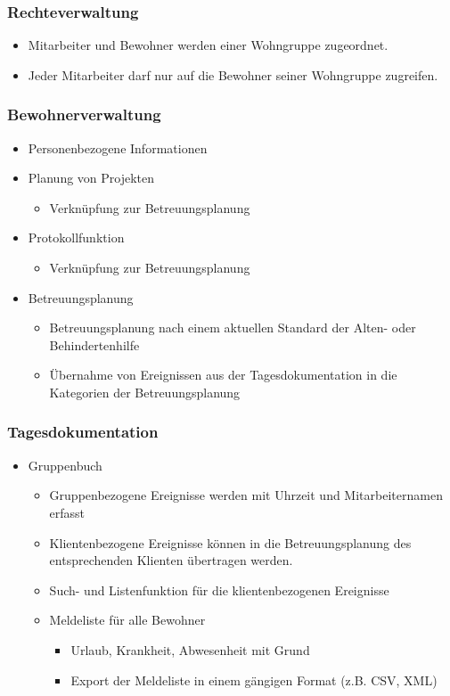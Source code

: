 \documentclass[a4paper,10pt]{article}
\begin{document}
\subsubsection{Rechteverwaltung}
\begin{itemize}
	\item Mitarbeiter und Bewohner werden einer Wohngruppe zugeordnet.
	\item Jeder Mitarbeiter darf nur auf die Bewohner seiner Wohngruppe zugreifen.
\end{itemize}
\subsubsection{Bewohnerverwaltung}
\begin{itemize}
	\item Personenbezogene Informationen
	\item Planung von Projekten
	\begin{itemize}
		\item Verknüpfung zur Betreuungsplanung
	\end{itemize}
	\item Protokollfunktion
	\begin{itemize}
		\item Verknüpfung zur Betreuungsplanung
	\end{itemize}
	\item  Betreuungsplanung
	\begin{itemize}
		\item Betreuungsplanung nach einem aktuellen Standard der Alten- oder Behindertenhilfe
		\item Übernahme von Ereignissen aus der Tagesdokumentation in die Kategorien der Betreuungsplanung
	\end{itemize}
\end{itemize}
\subsubsection{Tagesdokumentation}
\begin{itemize}
	\item Gruppenbuch
	\begin{itemize}
		\item Gruppenbezogene Ereignisse werden mit Uhrzeit und Mitarbeiternamen erfasst
		\item Klientenbezogene Ereignisse können in die Betreuungsplanung des entsprechenden Klienten übertragen werden.
		\item Such- und Listenfunktion für die klientenbezogenen Ereignisse
		\item Meldeliste für alle Bewohner
		\begin{itemize}
			\item Urlaub, Krankheit, Abwesenheit mit Grund
			\item Export der Meldeliste in einem gängigen Format (z.B. CSV, XML)
		\end{itemize}
	\end{itemize}
\end{itemize}
\end{document}
